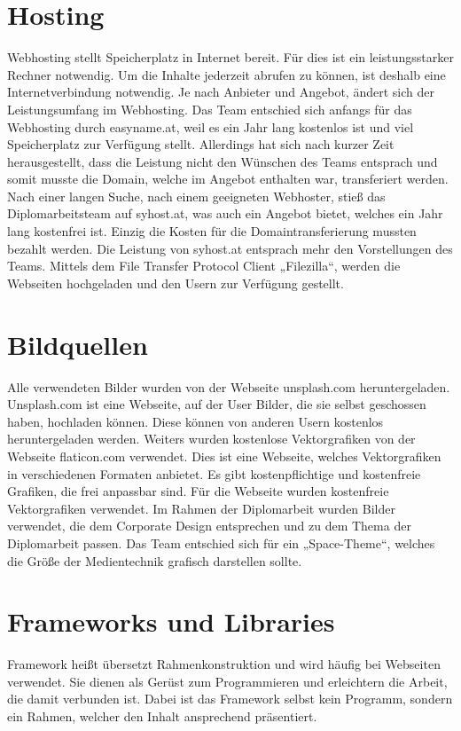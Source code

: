 \section{Hosting}
Webhosting stellt Speicherplatz in Internet bereit. Für dies ist ein leistungsstarker Rechner notwendig. Um die Inhalte jederzeit abrufen zu können, ist deshalb eine Internetverbindung notwendig. Je nach Anbieter und Angebot, ändert sich der Leistungsumfang im Webhosting.   Das Team entschied sich anfangs für das Webhosting durch easyname.at, weil es ein Jahr lang kostenlos ist und viel Speicherplatz zur Verfügung stellt. Allerdings hat sich nach kurzer Zeit herausgestellt, dass die Leistung nicht den Wünschen des Teams entsprach und somit musste die Domain, welche im Angebot enthalten war, transferiert werden. Nach einer langen Suche, nach einem geeigneten Webhoster, stieß das Diplomarbeitsteam auf syhost.at, was auch ein Angebot bietet, welches ein Jahr lang kostenfrei ist. Einzig die Kosten für die Domaintransferierung mussten bezahlt werden. Die Leistung von syhost.at entsprach mehr den Vorstellungen des Teams. Mittels dem File Transfer Protocol Client „Filezilla“, werden die Webseiten hochgeladen und den Usern zur Verfügung gestellt. 


\section{Bildquellen}
Alle verwendeten Bilder wurden von der Webseite unsplash.com heruntergeladen. Unsplash.com ist eine Webseite, auf der User Bilder, die sie selbst geschossen haben, hochladen können. Diese können von anderen Usern kostenlos heruntergeladen werden. Weiters wurden kostenlose Vektorgrafiken von der Webseite flaticon.com verwendet. Dies ist eine Webseite, welches Vektorgrafiken in verschiedenen Formaten anbietet. Es gibt kostenpflichtige und kostenfreie Grafiken, die frei anpassbar sind. Für die Webseite wurden kostenfreie Vektorgrafiken verwendet. Im Rahmen der Diplomarbeit wurden Bilder verwendet, die dem Corporate Design entsprechen und zu dem Thema der Diplomarbeit passen. Das Team entschied sich für ein „Space-Theme“, welches die Größe der Medientechnik grafisch darstellen sollte. 

\section{Frameworks und Libraries} 
Framework heißt übersetzt Rahmenkonstruktion und wird häufig bei Webseiten verwendet. Sie dienen als Gerüst zum Programmieren und erleichtern die Arbeit, die damit verbunden ist. Dabei ist das Framework selbst kein Programm, sondern ein Rahmen, welcher den Inhalt ansprechend präsentiert. 


